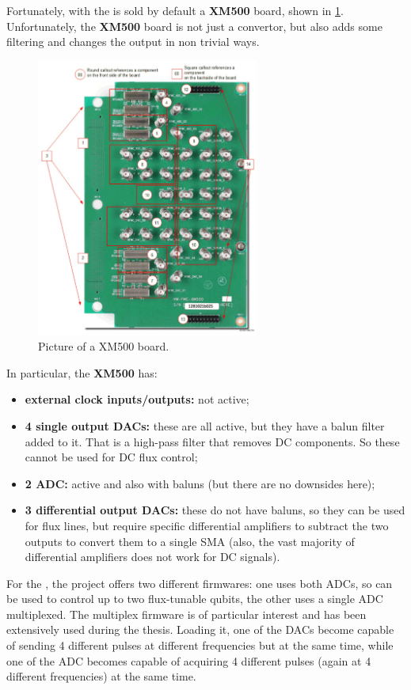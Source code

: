 Fortunately, with the \ZCU is sold by default a \textbf{XM500} board, shown in \cref{fig:xm500}.\\
Unfortunately, the \textbf{XM500} board is not just a convertor, but also adds some filtering and changes the output in non trivial ways.
\begin{figure}[ht]
    \centering
    \includegraphics[width=0.65\textwidth]{Setup-software/figures/xm500.jpeg}
    \caption{Picture of a XM500 board.}
    \label{fig:xm500}
\end{figure}
In particular, the \textbf{XM500} has:
\begin{itemize}
    \item \textbf{external clock inputs/outputs:} not active;
    \item \textbf{4 single output DACs:} these are all active, but they have a balun filter added to it. That is a high-pass filter that removes DC components. So these cannot be used for DC flux control;
    \item \textbf{2 ADC:} active and also with baluns (but there are no downsides here);
    \item \textbf{3 differential output DACs:} these do not have baluns, so they can be used for flux lines, but require specific differential amplifiers to subtract the two outputs to convert them to a single SMA (also, the vast majority of differential amplifiers does not work for DC signals).
\end{itemize}

For the \ZCU, the \Qick project offers two different firmwares: one uses both ADCs, so can be used to control up to two flux-tunable qubits, the other uses a single ADC multiplexed.
The multiplex firmware is of particular interest and has been extensively used during the thesis.
Loading it, one of the DACs become capable of sending 4 different pulses at different frequencies but at the same time, while one of the ADC becomes capable of acquiring 4 different pulses (again at 4 different frequencies) at the same time.

